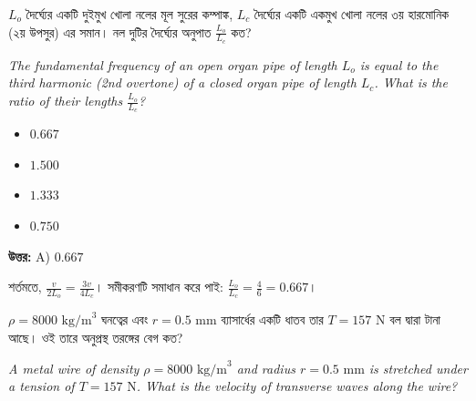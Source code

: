 \documentclass[12pt, a4paper]{article}
\begin{document}
\begin{tcolorbox}[questionbox={প্রশ্ন (Question) 13}]
    \noindent
    $L_o$ দৈর্ঘ্যের একটি দুইমুখ খোলা নলের মূল সুরের কম্পাঙ্ক, $L_c$ দৈর্ঘ্যের একটি একমুখ খোলা নলের ৩য় হারমোনিক (২য় উপসুর) এর সমান। নল দুটির দৈর্ঘ্যের অনুপাত $\frac{L_o}{L_c}$ কত?
    
    \vspace{0.8em}
    \begin{english}
    \noindent\textit{\color{darkgray}
    The fundamental frequency of an open organ pipe of length $L_o$ is equal to the third harmonic (2nd overtone) of a closed organ pipe of length $L_c$. What is the ratio of their lengths $\frac{L_o}{L_c}$?
    }
    \end{english}
\end{tcolorbox}

\begin{itemize}[label={}, leftmargin=1cm, itemsep=0.5em]
    \item[\textbf{A)}] $0.667$
    \item[\textbf{B)}] $1.500$
    \item[\textbf{C)}] $1.333$
    \item[\textbf{D)}] $0.750$
\end{itemize}

\vspace{0.5em}
\begin{tcolorbox}[answerbox]
    \textbf{\color{success} উত্তর:} A) $0.667$
\end{tcolorbox}
\vspace{1em}

\begin{tcolorbox}[solutionbox={সমাধান (Solution)}]
    \noindent
    শর্তমতে, $\frac{v}{2 L_o} = \frac{3v}{4 L_c}$। সমীকরণটি সমাধান করে পাই: $\frac{L_o}{L_c} = \frac{4}{6} = \mathbf{0.667}$।
\end{tcolorbox}

\vspace{2em}

\begin{tcolorbox}[questionbox={প্রশ্ন (Question) 14}]
    \noindent
    $\rho = 8000\text{ kg/m}^3$ ঘনত্বের এবং $r = 0.5\text{ mm}$ ব্যাসার্ধের একটি ধাতব তার $T = 157\text{ N}$ বল দ্বারা টানা আছে। ওই তারে অনুপ্রস্থ তরঙ্গের বেগ কত?
    
    \vspace{0.8em}
    \begin{english}
    \noindent\textit{\color{darkgray}
    A metal wire of density $\rho = 8000\text{ kg/m}^3$ and radius $r = 0.5\text{ mm}$ is stretched under a tension of $T = 157\text{ N}$. What is the velocity of transverse waves along the wire?
    }
    \end{english}
\end{tcolorbox}
\end{document}
